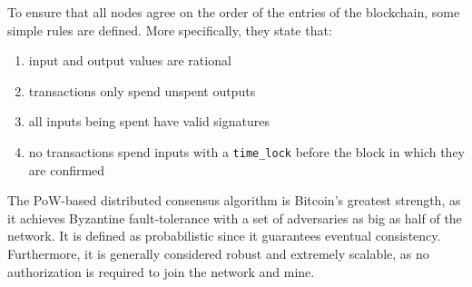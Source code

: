 To ensure that all nodes agree on the order of the entries of the blockchain, some simple rules are defined. More specifically, they state that:
\begin{enumerate}
	\item input and output values are rational
	\item transactions only spend unspent outputs
	\item all inputs being spent have valid signatures
	\item no transactions spend inputs with a \texttt{time\_lock} before the block in which they are confirmed
\end{enumerate} 
 
The PoW-based distributed consensus algorithm is Bitcoin's greatest strength, as it achieves Byzantine fault-tolerance with a set of adversaries as big as half of the network. It is defined as probabilistic since it guarantees eventual consistency. Furthermore, it is generally considered robust and extremely scalable, as no authorization is required to join the network and mine.\par